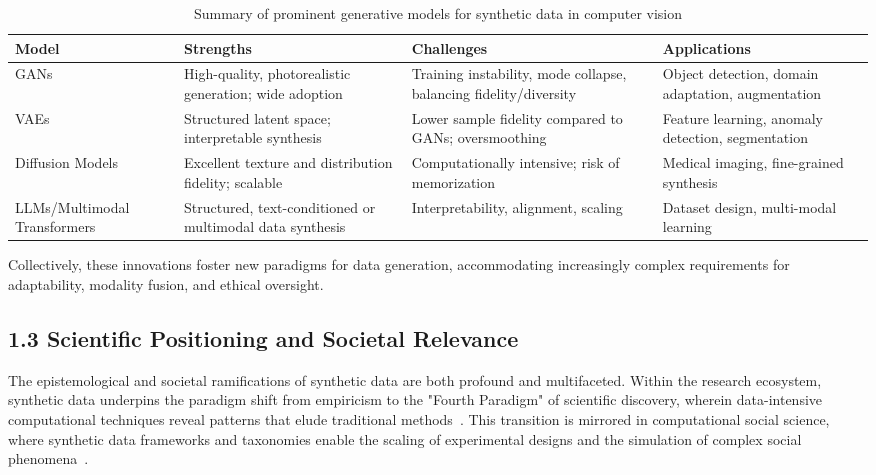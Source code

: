 \documentclass[11pt]{article}
\begin{document}
\begin{table}[ht]
    \centering
    \caption{Summary of prominent generative models for synthetic data in computer vision}
    \label{tab:gen_model_summary}
    \begin{tabular}{|l|p{4.2cm}|p{4cm}|p{3cm}|}
        \hline
        \textbf{Model} & \textbf{Strengths} & \textbf{Challenges} & \textbf{Applications} \\
        \hline
        GANs & High-quality, photorealistic generation; wide adoption & Training instability, mode collapse, balancing fidelity/diversity & Object detection, domain adaptation, augmentation \\
        \hline
        VAEs & Structured latent space; interpretable synthesis & Lower sample fidelity compared to GANs; oversmoothing & Feature learning, anomaly detection, segmentation \\
        \hline
        Diffusion Models & Excellent texture and distribution fidelity; scalable & Computationally intensive; risk of memorization & Medical imaging, fine-grained synthesis \\
        \hline
        LLMs/Multimodal Transformers & Structured, text-conditioned or multimodal data synthesis & Interpretability, alignment, scaling & Dataset design, multi-modal learning \\
        \hline
    \end{tabular}
\end{table}

Collectively, these innovations foster new paradigms for data generation, accommodating increasingly complex requirements for adaptability, modality fusion, and ethical oversight.

\subsection{1.3 Scientific Positioning and Societal Relevance}

The epistemological and societal ramifications of synthetic data are both profound and multifaceted. Within the research ecosystem, synthetic data underpins the paradigm shift from empiricism to the "Fourth Paradigm" of scientific discovery, wherein data-intensive computational techniques reveal patterns that elude traditional methods~\cite{ref13,ref14,ref33}. This transition is mirrored in computational social science, where synthetic data frameworks and taxonomies enable the scaling of experimental designs and the simulation of complex social phenomena~\cite{ref14,ref22,ref87}.
\end{document}
